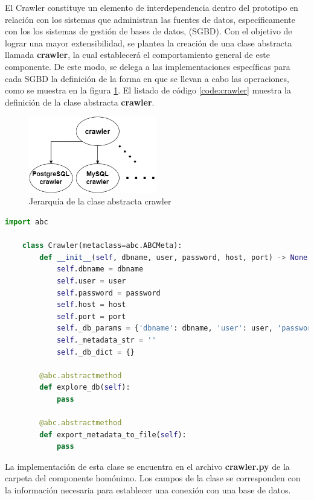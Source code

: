 El Crawler constituye un elemento de interdependencia dentro del prototipo en relación con los sistemas 
que administran las fuentes de datos, específicamente con los los sistemas de gestión de bases de datos, (SGBD). 
Con el objetivo de lograr una 
mayor extensibilidad, se plantea la creación de una clase abstracta llamada \textbf{crawler}, la cual establecerá 
el comportamiento general de este componente. De este modo, se delega a las implementaciones específicas para cada 
SGBD la definición de la forma en que se llevan a cabo las operaciones, como se muestra en la figura \ref{fig:crawler}. 
El listado de código \ref{code:crawler} muestra la definición de la clase abstracta \textbf{crawler}.

\begin{figure}[H]
    \centering
    \includegraphics[width=0.5\textwidth]{Graphics/crawler_class.drawio.png}
    \caption{Jerarquía de la clase abstracta crawler}
    \label{fig:crawler}
\end{figure}

\begin{lstlisting}[label={code:crawler}, caption={Definición de la clase abstracta crawler}, language={python}]
    import abc

    class Crawler(metaclass=abc.ABCMeta):
        def __init__(self, dbname, user, password, host, port) -> None:
            self.dbname = dbname
            self.user = user
            self.password = password
            self.host = host
            self.port = port
            self._db_params = {'dbname': dbname, 'user': user, 'password': password, 'host': host, 'port': port}
            self._metadata_str = ''
            self._db_dict = {}

        @abc.abstractmethod
        def explore_db(self):
            pass
        
        @abc.abstractmethod
        def export_metadata_to_file(self):
            pass

\end{lstlisting}

La implementación de esta clase se encuentra en el archivo \textbf{crawler.py} de la carpeta del componente homónimo. Los 
campos de la clase se corresponden con la información necesaria para establecer una conexión con una base de 
datos. 

